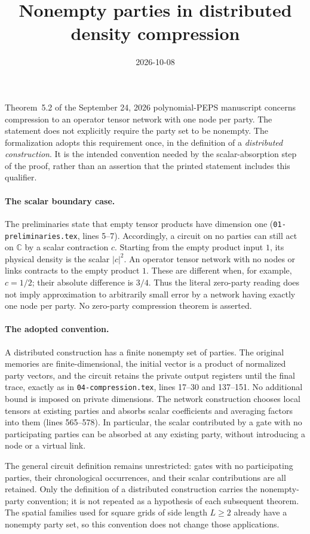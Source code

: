 \documentclass[11pt]{article}
\title{Nonempty parties in distributed density compression}
\author{}
\date{2026-10-08}
\begin{document}
\maketitle
{}

Theorem~5.2 of the September 24, 2026 polynomial-PEPS manuscript concerns
compression to an operator tensor network with one node per party.
The statement does not explicitly require the party set to be nonempty.
The formalization adopts this requirement once, in the definition of a
\emph{distributed construction}. It is the intended convention needed by
the scalar-absorption step of the proof, rather than an assertion that the
printed statement includes this qualifier.

\paragraph{The scalar boundary case.}
The preliminaries state that empty tensor products have dimension one
(\texttt{01-preliminaries.tex}, lines 5--7).
Accordingly, a circuit on no parties can still act on $\mathbb C$ by a scalar
contraction $c$. Starting from the empty product input $1$, its physical
density is the scalar $|c|^2$. An operator tensor network with no nodes or
links contracts to the empty product $1$. These are different when, for
example, $c=1/2$; their absolute difference is $3/4$.
Thus the literal zero-party reading does not imply approximation to
arbitrarily small error by a network having exactly one node per party.
No zero-party compression theorem is asserted.

\paragraph{The adopted convention.}
A distributed construction has a finite nonempty set of parties.
The original memories are finite-dimensional, the initial vector is a
product of normalized party vectors, and the circuit retains the private
output registers until the final trace, exactly as in
\texttt{04-compression.tex}, lines 17--30 and 137--151.
No additional bound is imposed on private dimensions.
The network construction chooses local tensors at existing parties and
absorbs scalar coefficients and averaging factors into them
(lines 565--578). In particular, the scalar contributed by a gate with no
participating parties can be absorbed at any existing party, without
introducing a node or a virtual link.

The general circuit definition remains unrestricted: gates with no
participating parties, their chronological occurrences, and their scalar
contributions are all retained. Only the definition of a distributed construction carries the
nonempty-party convention; it is not repeated as a hypothesis of each
subsequent theorem. The spatial families used for
square grids of side length $L\geq2$ already have a nonempty party set,
so this convention does not change those applications.
\end{document}
